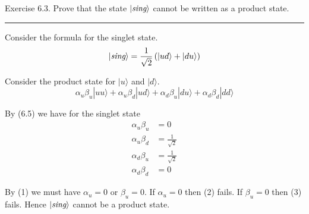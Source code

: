 \documentclass[12pt]{article}
\begin{document}
Exercise 6.3.
Prove that the state $|\text{\it sing}\rangle$ cannot be written
as a product state.

\bigskip
\hrule

\bigskip
Consider the formula for the singlet state.
\begin{equation*}
|\text{\it sing}\rangle=\frac{1}{\sqrt2}\left(|ud\rangle+|du\rangle\right)
\end{equation*}

Consider the product state for $|u\rangle$ and $|d\rangle$.
\begin{equation*}
\alpha_u\beta_u|uu\rangle
+\alpha_u\beta_d|ud\rangle
+\alpha_d\beta_u|du\rangle
+\alpha_d\beta_d|dd\rangle
\tag{6.5}
\end{equation*}

By (6.5) we have for the singlet state
\begin{align*}
\alpha_u\beta_u&=0\tag{1}
\\[1ex]
\alpha_u\beta_d&=\frac{1}{\sqrt2}\tag{2}
\\[1ex]
\alpha_d\beta_u&=\frac{1}{\sqrt2}\tag{3}
\\[1ex]
\alpha_d\beta_d&=0\tag{4}
\end{align*}

By (1) we must have $\alpha_u=0$ or $\beta_u=0$.
If $\alpha_u=0$ then (2) fails.
If $\beta_u=0$ then (3) fails.
Hence $|\text{\it sing}\rangle$ cannot be a product state.
\end{document}
